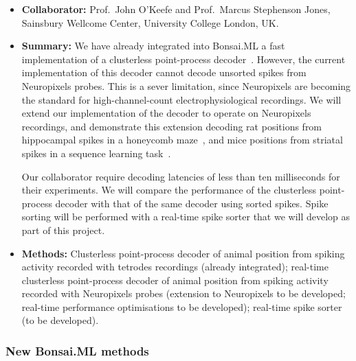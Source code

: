 
\begin{itemize}

    \item\textbf{Collaborator:} Prof.~John O'Keefe and Prof.~Marcus Stephenson
        Jones, Sainsbury Wellcome Center, University College London, UK.

    \item\textbf{Summary:} We have already integrated into Bonsai.ML a fast
        implementation of a clusterless point-process decoder~\citep[i.e., a
        decoder that does not require spike sorting and is suitable for
        real-time usage;][]{denovellisEtAl21}. However, the current
        implementation of this decoder cannot decode unsorted spikes from
        Neuropixels probes.
        This is a sever limitation, since Neuropixels are becoming the standard
        for high-channel-count electrophysiological recordings.
        We will extend our implementation of the decoder to operate on
        Neuropixels recordings, and demonstrate this extension decoding rat
        positions from hippocampal spikes in a honeycomb
        maze~\citep{woodEtAl18}, and mice positions from striatal spikes in a
        sequence learning task~\citep{thompsonEtAl24}.

        Our collaborator require decoding latencies of less than ten
        milliseconds for their experiments. We will compare the performance of
        the clusterless point-process decoder with that of the same decoder
        using sorted spikes.
        Spike sorting will be performed with a real-time spike sorter that we
        will develop as part of this project.

    \item\textbf{Methods:} Clusterless point-process decoder of animal position
        from spiking activity recorded with tetrodes recordings (already
        integrated); real-time clusterless point-process decoder of animal
        position from spiking activity recorded with Neuropixels probes
        (extension to Neuropixels to be developed; real-time performance
        optimisations to be developed); real-time spike sorter (to be
        developed).

\end{itemize}

\subsubsection{New Bonsai.ML methods}

